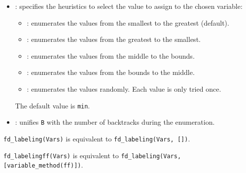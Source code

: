 \begin{itemize}
\item {}: specifies the heuristics
to select the value to assign to the chosen variable:

\begin{itemize}

\item {}: enumerates the values from the smallest to the greatest
(default).

\item {}: enumerates the values from the greatest to the smallest.

\item {}: enumerates the values from the middle to the bounds.

\item {}: enumerates the values from the bounds to the middle.

\item {}: enumerates the values randomly. Each value is only
tried once.

\end{itemize}

The default value is \texttt{min}.

\item {}: unifies \texttt{B} with the
number of backtracks during the enumeration.

\end{itemize}

\texttt{fd\_labeling(Vars)} is equivalent to \texttt{fd\_labeling(Vars,
[])}.

\texttt{fd\_labelingff(Vars)} is equivalent to \texttt{fd\_labeling(Vars,
[variable\_method(ff)])}.

\begin{PlErrors}







\end{PlErrors}

